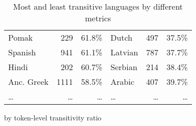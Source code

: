 \begin{table}[ht]
\begin{subtable}[c]{\textwidth}
\begin{tabular}{lrr|lrr}
        Pomak & 229 & 61.8\% & Dutch & 497 & 37.5\% \\
        Spanish & 941 & 61.1\% & Latvian & 787 & 37.7\% \\
        Hindi & 202 & 60.7\% & Serbian & 214 & 38.4\% \\
        Anc. Greek & 1111 & 58.5\% & Arabic & 407 & 39.7\% \\
        \dots & \dots & \dots & \dots & \dots & \dots \\
        \bottomrule
      \end{tabular}
      \caption{by token-level transitivity ratio}
      \label{tab:most_tr_by_token_mean}
    \end{subtable}
    \caption{Most and least transitive languages by different metrics}
    \label{tab:most_tr_languages}
  \end{table}